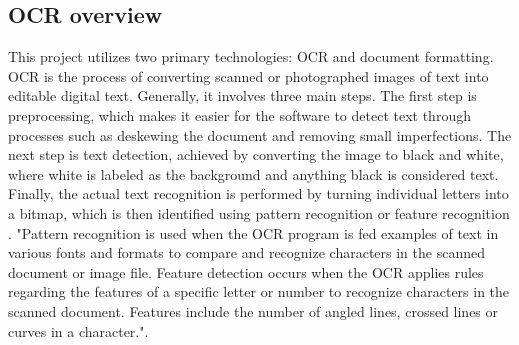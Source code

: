 \documentclass[10pt,twocolumn]{article}
\begin{document}
\subsection{OCR overview}
This project utilizes two primary technologies: OCR and document formatting. OCR is the process of converting scanned or photographed images of text into editable digital text. Generally, it involves three main steps. The first step is preprocessing, which makes it easier for the software to detect text through processes such as deskewing the document and removing small imperfections\cite{amazonOCR}. The next step is text detection, achieved by converting the image to black and white, where white is labeled as the background and anything black is considered text\cite{geeksOCR}. Finally, the actual text recognition is performed by turning individual letters into a bitmap, which is then identified using pattern recognition or feature recognition \cite{ibmOCR}. "Pattern recognition is used when the OCR program is fed examples of text in various fonts and formats to compare and recognize characters in the scanned document or image file. Feature detection occurs when the OCR applies rules regarding the features of a specific letter or number to recognize characters in the scanned document. Features include the number of angled lines, crossed lines or curves in a character.\cite{ibmOCR}".
\end{document}
